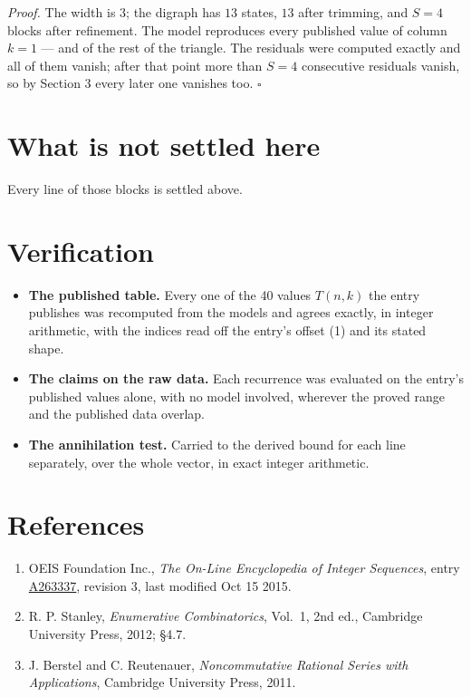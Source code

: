 \documentclass[11pt]{article}
\theoremstyle{definition}
\begin{document}
{\itshape Proof.} The width is $3$; the digraph has $13$ states, $13$ after trimming, and $S = 4$ blocks after refinement. The model reproduces every published value of column $k = 1$ --- and of the rest of the triangle. The residuals were computed exactly and all of them vanish; after that point more than $S = 4$ consecutive residuals vanish, so by Section 3 every later one vanishes too. $\square$

\section{What is not settled here}

Every line of those blocks is settled above.

\section{Verification}

\begin{itemize}

\item {\bfseries The published table.} Every one of the 40 values $T(n,k)$ the entry publishes was recomputed from the models and agrees exactly, in integer arithmetic, with the indices read off the entry's offset (1) and its stated shape.

\item {\bfseries The claims on the raw data.} Each recurrence was evaluated on the entry's published values alone, with no model involved, wherever the proved range and the published data overlap.

\item {\bfseries The annihilation test.} Carried to the derived bound for each line separately, over the whole vector, in exact integer arithmetic.

\end{itemize}

\section{References}

\begin{enumerate}

\item OEIS Foundation Inc., \emph{The On-Line Encyclopedia of Integer Sequences}, entry \href{https://oeis.org/A263337}{A263337}, revision 3, last modified Oct 15 2015.

\item R. P. Stanley, \emph{Enumerative Combinatorics}, Vol.~1, 2nd ed., Cambridge University Press, 2012; \S4.7.

\item J. Berstel and C. Reutenauer, \emph{Noncommutative Rational Series with Applications}, Cambridge University Press, 2011.

\end{enumerate}
\end{document}

